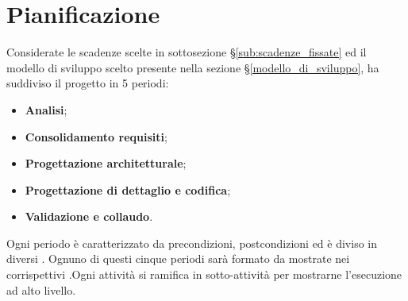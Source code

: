 \section{Pianificazione}
\label{pianificazione}
Considerate le scadenze scelte in sottosezione \S\ref{sub:scadenze_fissate} ed il modello di sviluppo scelto presente nella sezione \S\ref{modello_di_sviluppo}, {\Gruppo} ha suddiviso il progetto in 5 periodi:
\begin{itemize}
    \item \textbf{Analisi};
    \item \textbf{Consolidamento requisiti};
    \item \textbf{Progettazione architetturale};
    \item \textbf{Progettazione di dettaglio e codifica};
    \item \textbf{Validazione e collaudo}.
\end{itemize}
Ogni periodo è caratterizzato da precondizioni, postcondizioni ed è diviso in diversi . Ognuno di questi cinque periodi sarà formato da  mostrate nei corrispettivi .Ogni attività si ramifica in sotto-attività per mostrarne l'esecuzione ad alto livello.


\newpage

\newpage

\newpage

\newpage

\newpage
